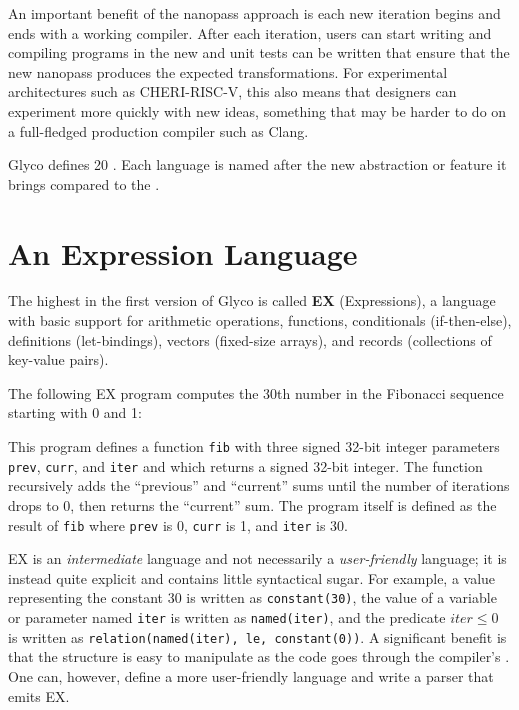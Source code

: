 \documentclass[main.tex]{subfiles}
\begin{document}
An important benefit of the nanopass approach is each new iteration begins and ends with a working compiler. After each iteration, users can start writing and compiling programs in the new \il{} and unit tests can be written that ensure that the new \gls{nanopass} produces the expected transformations. For experimental architectures such as CHERI-RISC-V, this also means that designers can experiment more quickly with new ideas, something that may be harder to do on a full-fledged production compiler such as Clang.

Glyco defines 20 . Each language is named after the new abstraction or feature it brings compared to the .

\section{An Expression Language}
The highest \il{} in the first version of Glyco is called \textbf{EX} (Expressions), a language with basic support for arithmetic operations, functions, conditionals (if-then-else), definitions (let-bindings), vectors (fixed-size arrays), and records (collections of key-value pairs).

The following EX program computes the 30th number in the Fibonacci sequence starting with 0 and 1:


This program defines a function \texttt{fib} with three signed 32-bit integer parameters \texttt{prev}, \texttt{curr}, and \texttt{iter} and which returns a signed 32-bit integer. The function recursively adds the \enquote{previous} and \enquote{current} sums until the number of iterations drops to 0, then returns the \enquote{current} sum. The program itself is defined as the result of \texttt{fib} where \texttt{prev} is 0, \texttt{curr} is 1, and \texttt{iter} is 30.

EX is an \emph{intermediate} language and not necessarily a \emph{user-friendly} language; it is instead quite explicit and contains little syntactical sugar. For example, a value representing the constant 30 is written as \texttt{constant(30)}, the value of a variable or parameter named \texttt{iter} is written as \texttt{named(iter)}, and the predicate $ \textit{iter} \le 0 $ is written as \texttt{relation(named(iter), le, constant(0))}. A significant benefit is that the structure is easy to manipulate as the code goes through the compiler's . One can, however, define a more user-friendly language and write a parser that emits EX.
\end{document}
